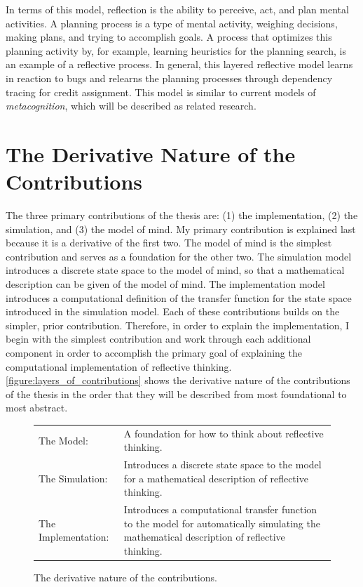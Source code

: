 In terms of this model, reflection is the ability to perceive, act,
and plan mental activities.  A planning process is a type of mental
activity, weighing decisions, making plans, and trying to accomplish
goals.  A process that optimizes this planning activity by, for
example, learning heuristics for the planning search, is an example of
a reflective process.  In general, this layered reflective model
learns in reaction to bugs and relearns the planning processes through
dependency tracing for credit assignment.  This model is similar to
current models of \emph{metacognition}, which will be described as
related research.

\section{The Derivative Nature of the Contributions}

The three primary contributions of the thesis are: (1) the
implementation, (2) the simulation, and (3) the model of mind.  My
primary contribution is explained last because it is a derivative of
the first two.  The model of mind is the simplest contribution and
serves as a foundation for the other two.  The simulation model
introduces a discrete state space to the model of mind, so that a
mathematical description can be given of the model of mind.  The
implementation model introduces a computational definition of the
transfer function for the state space introduced in the simulation
model.  Each of these contributions builds on the simpler, prior
contribution.  Therefore, in order to explain the implementation, I
begin with the simplest contribution and work through each additional
component in order to accomplish the primary goal of explaining the
computational implementation of reflective thinking.
{\mbox{\autoref{figure:layers_of_contributions}}} shows the derivative
nature of the contributions of the thesis in the order that they will
be described from most foundational to most abstract.
\begin{figure}
\center
\begin{tabular}{p{3.5cm}p{6.5cm}}
The Model:          & A foundation for how to think about reflective thinking. \\
The Simulation:     & Introduces a discrete state space to the model for a mathematical description of reflective thinking. \\
The Implementation: & Introduces a computational transfer function to the model for automatically simulating the mathematical description of reflective thinking.
\end{tabular}
\caption{The derivative nature of the contributions.}
\label{figure:layers_of_contributions}
\end{figure}

